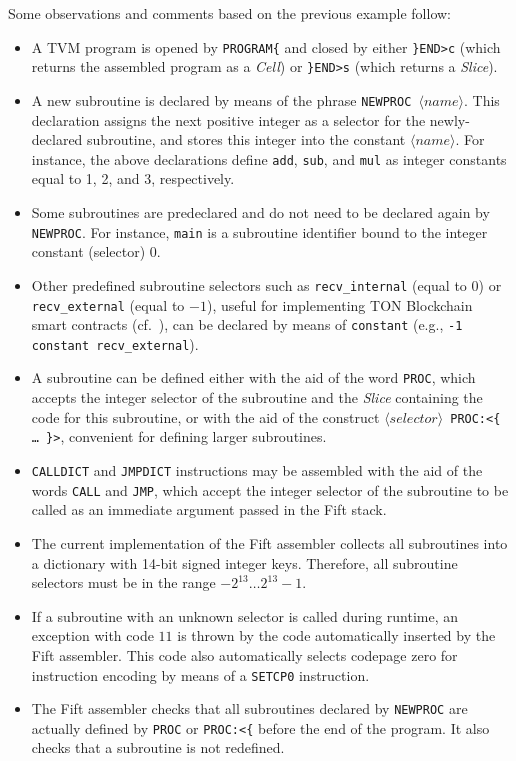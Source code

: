 \documentclass[12pt,oneside]{article}
\begin{document}
Some observations and comments based on the previous example follow:
\begin{itemize}
\item A TVM program is opened by {\tt PROGRAM\{} and closed by either {\tt \}END>c} (which returns the assembled program as a {\em Cell\/}) or {\tt \}END>s} (which returns a {\em Slice\/}).
\item A new subroutine is declared by means of the phrase {\tt NEWPROC $\langle\textit{name}\rangle$}. This declaration assigns the next positive integer as a selector for the newly-declared subroutine, and stores this integer into the constant $\langle\textit{name}\rangle$. For instance, the above declarations define {\tt add}, {\tt sub}, and {\tt mul} as integer constants equal to 1, 2, and 3, respectively.
\item Some subroutines are predeclared and do not need to be declared again by {\tt NEWPROC}. For instance, {\tt main} is a subroutine identifier bound to the integer constant (selector) 0.
\item Other predefined subroutine selectors such as {\tt recv\_internal} (equal to $0$) or {\tt recv\_external} (equal to $-1$), useful for implementing TON Blockchain smart contracts (cf.~\cite[4.4]{TBC}), can be declared by means of {\tt constant} (e.g., {\tt -1 constant recv\_external}).
\item A subroutine can be defined either with the aid of the word {\tt PROC}, which accepts the integer selector of the subroutine and the {\em Slice} containing the code for this subroutine, or with the aid of the construct {\tt $\langle\textit{selector}\rangle$ PROC:<\{ \dots\ \}>}, convenient for defining larger subroutines.
\item {\tt CALLDICT} and {\tt JMPDICT} instructions may be assembled with the aid of the words {\tt CALL} and {\tt JMP}, which accept the integer selector of the subroutine to be called as an immediate argument passed in the Fift stack.
\item The current implementation of the Fift assembler collects all subroutines into a dictionary with 14-bit signed integer keys. Therefore, all subroutine selectors must be in the range $-2^{13}\dots 2^{13}-1$.
\item If a subroutine with an unknown selector is called during runtime, an exception with code $11$ is thrown by the code automatically inserted by the Fift assembler. This code also automatically selects codepage zero for instruction encoding by means of a {\tt SETCP0} instruction.
\item The Fift assembler checks that all subroutines declared by {\tt NEWPROC} are actually defined by {\tt PROC} or {\tt PROC:<\{} before the end of the program. It also checks that a subroutine is not redefined.
\end{itemize}
\end{document}
